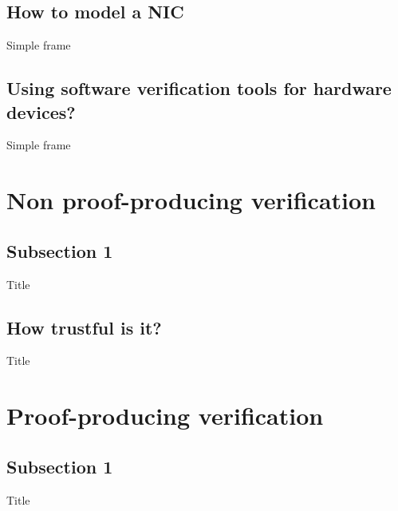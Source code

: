 \documentclass{beamer}
\begin{document}
\subsection{How to model a NIC}

\begin{frame}{Simple frame}
\end{frame}

\subsection{Using software verification tools for hardware devices?}

\begin{frame}{Simple frame}
\end{frame}


\section{Non proof-producing verification}

\subsection{Subsection 1}

\begin{frame}{Title}
\end{frame}

\subsection{How trustful is it?}

\begin{frame}{Title}
\end{frame}

\section{Proof-producing verification}

\subsection{Subsection 1}

\begin{frame}{Title}
\end{frame}
\end{document}
